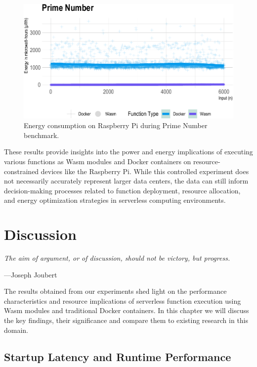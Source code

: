 \documentclass[
  table]{report}
\begin{document}
\begin{figure}[H]

{\centering \includegraphics{thesis_files/figure-latex/prime-energy-1} 

}

\caption{Energy consumption on Raspberry Pi during Prime Number benchmark.}\label{fig:prime-energy}
\end{figure}

These results provide insights into the power and energy implications of
executing various functions as \ac{Wasm} modules and Docker containers
on resource-constrained devices like the Raspberry Pi. While this
controlled experiment does not necessarily accurately represent larger
data centers, the data can still inform decision-making processes
related to function deployment, resource allocation, and energy
optimization strategies in serverless computing environments.

\newpage
\chapter{Discussion}
\label{chap:discussion}

\epigraph{\itshape  
The aim of argument, or of discussion, should not be victory, but progress.
}{---Joseph Joubert}

The results obtained from our experiments shed light on the performance
characteristics and resource implications of serverless function
execution using \ac{Wasm} modules and traditional Docker containers. In
this chapter we will discuss the key findings, their significance and
compare them to existing research in this domain.

\section{Startup Latency and Runtime Performance}
\end{document}
